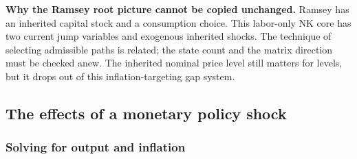 \begin{blueblock}
\textbf{Why the Ramsey root picture cannot be copied unchanged.}
Ramsey has an inherited capital stock and a consumption choice. This labor-only
NK core has two current jump variables and exogenous inherited shocks. The
technique of selecting admissible paths is related; the state count and the
matrix direction must be checked anew. The inherited nominal price level still
matters for levels, but it drops out of this inflation-targeting gap system.
\end{blueblock}

\subsection{The effects of a monetary policy shock}

\subsubsection{Solving for output and inflation}

